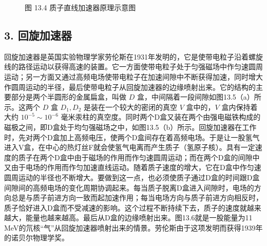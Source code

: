\begin{figure}
{%
}
\caption{图 13.4 质子直线加速器原理示意图}
\end{figure}

\subsection{3. 回旋加速器}

回旋加速器是英国实验物理学家劳伦斯在1931年发明的，它是使带电粒子沿着螺旋线的路径运动以获得高速的装置。它一方面使带电粒子处于匀强磁场中作匀速圆周运动；另一方面又通过高频电场使带电粒子在加速间隙中不断获得加速，同时增大作圆周运动的半径，最后使带电粒子从回旋加速器的边缘喷射出来。它的结构的主要部分是两个半圆形的金属扁盒，叫做
\(D\) 盒，中间隔着一段间隙如图13.5（a）所示。这两个 \(D\) 盒
\(D_{1}, D_{2}\) 是装在一个较大的密闭的真空 \(V\) 盒中的，\(V\)
盒内保持着大约 \(10^{-5} \sim 10^{-6}\)
毫米汞柱的真空度。同时两个D盒又装在两个由强电磁铁构成的磁极之间，即D盒处于均匀强磁场之中，如图13.5（b）所示。回旋加速器在工作时，先对两个D盒加上高频电压，使两个D盒间存在着高频电场。于是让一股氢气进入V盒，在中心的热灯丝F就会使氢气电离而产生质子（氢原子核）。具有一定速度的质子在两个D盒中由于磁场的作用而作匀速圆周运动；而在两个D盒的间隙中又由于电场的作用而作匀加速直线运动。随着质子速度的增大，它在D盒中作匀速圆周运动的半径也不断增大。要做到这一点，也必须使质子通过D盒的时间跟D盒间隙间的高频电场的变化周期协调起来。每当质子脱离D盒进入间隙时，电场的方向总是与质子前进方向一致而起加速作用；每当电场方向与质子前进方向相反时，质子恰好进入D盒而不受减速的影响。这个过程不断持续下去，质子的速度就越来越大，能量也越来越高。最后从D盒的边缘喷射出来。图13.6就是一股能量为11
MeV的氘核``气''从回旋加速器喷射出来的情景。劳伦斯由于这项发明而获得1939年的诺贝尔物理学奖。

